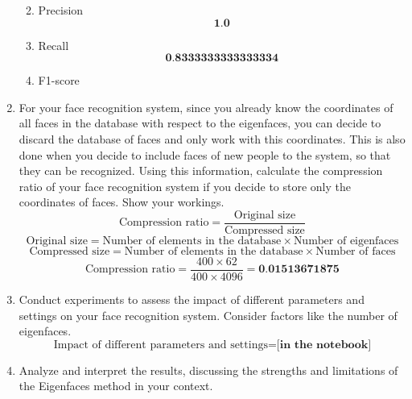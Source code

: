 \documentclass[12pt]{extarticle} %
\begin{document}
\begin{enumerate}
\begin{enumerate}
\[        \]
        \item Precision
        \[
            \textbf{1.0}
        \]
        \item Recall
        \[
            \textbf{0.8333333333333334}
        \]
        \item F1-score
        \[
        \textbf{}
        \]
    \end{enumerate}
    \item For your face recognition system, since you already know the coordinates of all faces in the database
    with respect to the eigenfaces, you can decide to discard the database of faces and only work with this
    coordinates. This is also done when you decide to include faces of new people to the system, so that
    they can be recognized. Using this information, calculate the compression ratio of your face recognition
    system if you decide to store only the coordinates of faces. Show your workings.
    \[
    \text{Compression ratio} = \frac{\text{Original size}}{\text{Compressed size}}
    \]
    \[
    \text{Original size} = \text{Number of elements in the database} \times \text{Number of eigenfaces}
    \]
    \[
    \text{Compressed size} = \text{Number of elements in the database} \times \text{Number of faces}
    \]
    \[
    \text{Compression ratio} = \frac{400 \times 62}{400 \times 4096} = \textbf{0.01513671875}
    \]
    \item Conduct experiments to assess the impact of different parameters and settings on your face recognition
    system. Consider factors like the number of eigenfaces.
    \[
    \text{Impact of different parameters and settings} = \textbf{[in the notebook]}
    \]
    \item Analyze and interpret the results, discussing the strengths and limitations of the Eigenfaces method
    in your context.
\end{enumerate}
\end{document}
